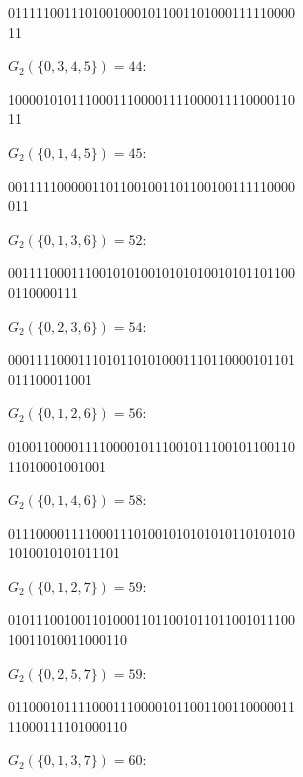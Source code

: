 \documentclass[12pt]{article}
\begin{document}
\begin{center}\ttfamily\footnotesize
01111100111010010001011001101000111110000\\
11
\end{center}
$G_{2}(\{0,3,4,5\})=44$:

\begin{center}\ttfamily\footnotesize
10000101011100011100001111000011110000110\\
11
\end{center}
$G_{2}(\{0,1,4,5\})=45$:

\begin{center}\ttfamily\footnotesize
00111110000011011001001101100100111110000\\
011
\end{center}
$G_{2}(\{0,1,3,6\})=52$:

\begin{center}\ttfamily\footnotesize
00111100011100101010010101010010101101100\\
0110000111
\end{center}
$G_{2}(\{0,2,3,6\})=54$:

\begin{center}\ttfamily\footnotesize
00011110001110101101010001110110000101101\\
011100011001
\end{center}
$G_{2}(\{0,1,2,6\})=56$:

\begin{center}\ttfamily\footnotesize
01001100001111000010111001011100101100110\\
11010001001001
\end{center}
$G_{2}(\{0,1,4,6\})=58$:

\begin{center}\ttfamily\footnotesize
01110000111100011101001010101010110101010\\
1010010101011101
\end{center}
$G_{2}(\{0,1,2,7\})=59$:

\begin{center}\ttfamily\footnotesize
01011100100110100011011001011011001011100\\
10011010011000110
\end{center}
$G_{2}(\{0,2,5,7\})=59$:

\begin{center}\ttfamily\footnotesize
01100010111100011100001011001100110000011\\
11000111101000110
\end{center}
$G_{2}(\{0,1,3,7\})=60$:
\end{document}
